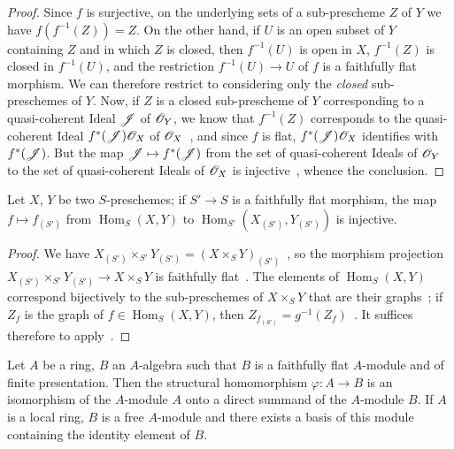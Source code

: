 \begin{proof}
Since $f$ is surjective, on the underlying sets of a sub-prescheme $Z$ of $Y$ we have $f(f^{-1}(Z))=Z$.
On the other hand, if $U$ is an open subset of $Y$ containing $Z$ and in which $Z$ is closed, then $f^{-1}(U)$ is open in $X$, $f^{-1}(Z)$ is closed in $f^{-1}(U)$, and the restriction $f^{-1}(U)\to U$ of $f$ is a faithfully flat morphism.
We can therefore restrict to considering only the \emph{closed} sub-preschemes of $Y$.
Now, if $Z$ is a closed sub-prescheme of $Y$ corresponding to a quasi-coherent Ideal $\mathscr{J}$ of $\mathscr{O}_Y$, we know that $f^{-1}(Z)$ corresponds to the quasi-coherent Ideal $f^*(\mathscr{J})\mathscr{O}_X$ of $\mathscr{O}_X$~, and since $f$ is flat, $f^*(\mathscr{J})\mathscr{O}_X$ identifies with $f^*(\mathscr{J})$.
But the map $\mathscr{J}\mapsto f^*(\mathscr{J})$ from the set of quasi-coherent Ideals of $\mathscr{O}_Y$ to the set of quasi-coherent Ideals of $\mathscr{O}_X$ is injective~, whence the conclusion.
\end{proof}

\begin{corollary}[2.2.16]
\label{IV.2.2.16}
Let $X$, $Y$ be two $S$-preschemes; if $S'\to S$ is a faithfully flat morphism, the map $f\mapsto f_{(S')}$ from $\operatorname{Hom}_S(X,Y)$ to $\operatorname{Hom}_{S'}(X_{(S')},Y_{(S')})$ is injective.
\end{corollary}

\begin{proof}
We have $X_{(S')}\times_{S'}Y_{(S')}=(X\times_S Y)_{(S')}$~, so the morphism projection $X_{(S')}\times_{S'}Y_{(S')}\to X\times_S Y$ is faithfully flat~.
The elements of $\operatorname{Hom}_S(X,Y)$ correspond bijectively to the sub-preschemes of $X\times_S Y$ that are their graphs~; if $Z_f$ is the graph of $f\in\operatorname{Hom}_S(X,Y)$, then $Z_{f_{(S')}}=g^{-1}(Z_f)$~.
It suffices therefore to apply~.
\end{proof}

\begin{proposition}[2.2.17]
\label{IV.2.2.17}
Let $A$ be a ring, $B$ an $A$-algebra such that $B$ is a faithfully flat $A$-module and of finite presentation.
Then the structural homomorphism $\varphi:A\to B$ is an isomorphism of the $A$-module $A$ onto a direct summand of the $A$-module $B$.
If $A$ is a local ring, $B$ is a free $A$-module and there exists a basis of this module containing the identity element of $B$.
\end{proposition}

